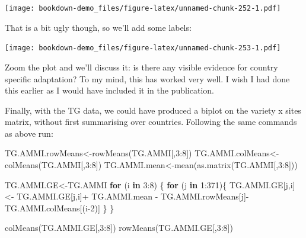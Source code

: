 \documentclass[
]{book}
\newenvironment{Shaded}{\begin{snugshade}}{\end{snugshade}}
\newcommand{\AttributeTok}[1]{\textcolor[rgb]{0.77,0.63,0.00}{#1}}
\newcommand{\ControlFlowTok}[1]{\textcolor[rgb]{0.13,0.29,0.53}{\textbf{#1}}}
\newcommand{\DecValTok}[1]{\textcolor[rgb]{0.00,0.00,0.81}{#1}}
\newcommand{\FloatTok}[1]{\textcolor[rgb]{0.00,0.00,0.81}{#1}}
\newcommand{\FunctionTok}[1]{\textcolor[rgb]{0.00,0.00,0.00}{#1}}
\newcommand{\NormalTok}[1]{#1}
\newcommand{\OtherTok}[1]{\textcolor[rgb]{0.56,0.35,0.01}{#1}}
\newcommand{\SpecialCharTok}[1]{\textcolor[rgb]{0.00,0.00,0.00}{#1}}
\newcommand{\StringTok}[1]{\textcolor[rgb]{0.31,0.60,0.02}{#1}}
\begin{document}
\texttt{[image: bookdown-demo\_files/figure-latex/unnamed-chunk-252-1.pdf]}

That is a bit ugly though, so we'll add some labels:

\begin{Shaded}
\end{Shaded}

\texttt{[image: bookdown-demo\_files/figure-latex/unnamed-chunk-253-1.pdf]}

Zoom the plot and we'll discuss it: is there any visible evidence for country specific adaptation? To my mind, this has worked very well. I wish I had done this earlier as I would have included it in the publication.

Finally, with the TG data, we could have produced a biplot on the variety x sites matrix, without first summarising over countries. Following the same commands as above run:

\begin{Shaded}
\begin{Highlighting}[]
\NormalTok{TG.AMMI.rowMeans}\OtherTok{\textless{}{-}}\FunctionTok{rowMeans}\NormalTok{(TG.AMMI[,}\DecValTok{3}\SpecialCharTok{:}\DecValTok{8}\NormalTok{])}
\NormalTok{TG.AMMI.colMeans}\OtherTok{\textless{}{-}}\FunctionTok{colMeans}\NormalTok{(TG.AMMI[,}\DecValTok{3}\SpecialCharTok{:}\DecValTok{8}\NormalTok{])}
\NormalTok{TG.AMMI.mean}\OtherTok{\textless{}{-}}\FunctionTok{mean}\NormalTok{(}\FunctionTok{as.matrix}\NormalTok{(TG.AMMI[,}\DecValTok{3}\SpecialCharTok{:}\DecValTok{8}\NormalTok{]))        }

\NormalTok{TG.AMMI.GE}\OtherTok{\textless{}{-}}\NormalTok{TG.AMMI}
 \ControlFlowTok{for}\NormalTok{ (i }\ControlFlowTok{in} \DecValTok{3}\SpecialCharTok{:}\DecValTok{8}\NormalTok{) \{}
   \ControlFlowTok{for}\NormalTok{ (j }\ControlFlowTok{in} \DecValTok{1}\SpecialCharTok{:}\DecValTok{371}\NormalTok{)\{ }
\NormalTok{     TG.AMMI.GE[j,i]}\OtherTok{\textless{}{-}}
\NormalTok{     TG.AMMI.GE[j,i]}\SpecialCharTok{+}\NormalTok{ TG.AMMI.mean }\SpecialCharTok{{-}}\NormalTok{ TG.AMMI.rowMeans[j]}\SpecialCharTok{{-}}\NormalTok{ TG.AMMI.colMeans[(i}\DecValTok{{-}2}\NormalTok{)]}
\NormalTok{     \}}
\NormalTok{ \}}

\FunctionTok{colMeans}\NormalTok{(TG.AMMI.GE[,}\DecValTok{3}\SpecialCharTok{:}\DecValTok{8}\NormalTok{])}
\FunctionTok{rowMeans}\NormalTok{(TG.AMMI.GE[,}\DecValTok{3}\SpecialCharTok{:}\DecValTok{8}\NormalTok{])}
\end{Highlighting}
\end{Shaded}
\end{document}
